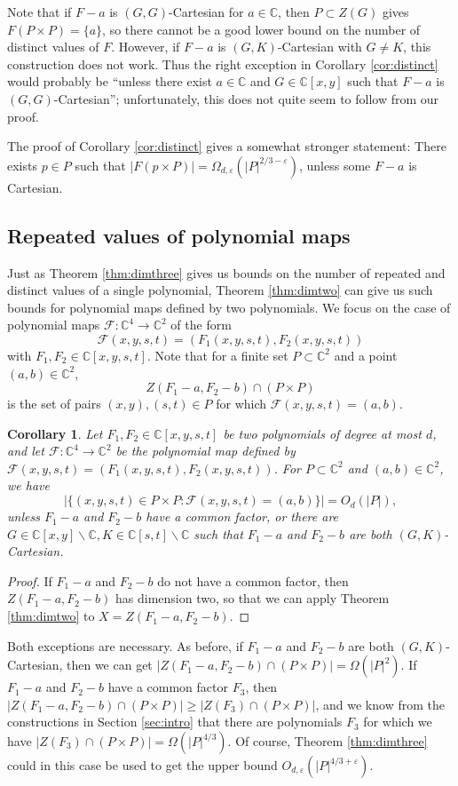 \documentclass{daj}
\newtheorem{corollary}[theorem]{Corollary}
\theoremstyle{definition}
\newcommand{\C}{\mathbb C}
\newcommand{\eps}{\varepsilon}
\begin{document}
Note that if $F-a$ is $(G,G)$-Cartesian for $a\in \C$, 
then $P\subset Z(G)$ gives $F(P\times P) = \{a\}$, so there cannot be a good lower bound on the number of distinct values of $F$.
However, if $F-a$ is $(G,K)$-Cartesian with $G\neq K$, this construction does not work.
Thus the right exception in Corollary \ref{cor:distinct} would probably be ``unless there exist $a\in \C$ and $G\in \C[x,y]$ such that $F-a$ is $(G,G)$-Cartesian''; unfortunately, this does not quite seem to follow from our proof.

The proof of Corollary \ref{cor:distinct} gives a somewhat stronger statement: There exists $p\in P$ such that $|F(p\times P)| = \Omega_{d,\eps}(|P|^{2/3-\eps})$, unless some $F-a$ is Cartesian.

\subsection{Repeated values of polynomial maps}

Just as Theorem \ref{thm:dimthree} gives us bounds on the number of repeated and distinct values of a single polynomial, 
Theorem \ref{thm:dimtwo} can give us such bounds for polynomial maps defined by two polynomials.
We focus on the case of polynomial maps $\mathcal{F}:\C^4\to\C^2$ of the form
\[\mathcal{F}(x,y,s,t)= (F_1(x,y,s,t), F_2(x,y,s,t))\]
with $F_1,F_2\in \C[x,y,s,t]$.
Note that for a finite set $P\subset \C^2$
 and a point $(a,b)\in\C^2$, 
\[Z(F_1-a,F_2-b)\cap (P\times P)\]
 is the set of pairs $(x,y),(s,t)\in P$ for which $\mathcal{F}(x,y,s,t) = (a,b)$.


\begin{corollary}\label{cor:maprepeated}
Let $F_1,F_2\in \C[x,y,s,t]$ be two polynomials of degree at most $d$, and let $\mathcal{F}:\C^4\to\C^2$ be the polynomial map defined by $\mathcal{F}(x,y,s,t)= (F_1(x,y,s,t), F_2(x,y,s,t))$.
For $P\subset \C^2$ and $(a,b)\in \C^2$, we have
\[|\{(x,y,s,t)\in P\times P: \mathcal{F}(x,y,s,t)=(a,b)\}| = O_d(|P|),\]
unless $F_1-a$ and $F_2-b$ have a common factor, or there are $G\in \C[x,y]\backslash\C,K\in\C[s,t]\backslash\C$ such that $F_1-a$ and $F_2-b$ are both $(G,K)$-Cartesian. 
\end{corollary}
\begin{proof}
If $F_1-a$ and $F_2-b$ do not have a common factor, 
then $Z(F_1-a,F_2-b)$ has dimension two, so that we can apply Theorem \ref{thm:dimtwo} to $X = Z(F_1-a,F_2-b)$.
\end{proof}


Both exceptions are necessary.
As before, if $F_1-a$ and $F_2-b$ are both $(G,K)$-Cartesian, then we can get $|Z(F_1-a,F_2-b)\cap (P\times P)| = \Omega(|P|^2)$.
If $F_1-a$ and $F_2-b$ have a common factor $F_3$, 
then $|Z(F_1-a,F_2-b)\cap (P\times P)| \geq |Z(F_3)\cap (P\times P)|$, and we know from the constructions in Section \ref{sec:intro} that there are polynomials $F_3$ for which we have $|Z(F_3)\cap (P\times P)| = \Omega(|P|^{4/3})$.
Of course, Theorem \ref{thm:dimthree} could in this case be used to get the upper bound $O_{d,\eps}(|P|^{4/3+\eps})$.
\end{document}
